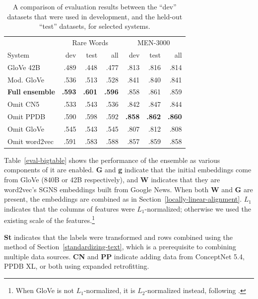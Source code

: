 \documentclass[11pt,letterpaper]{article}
\begin{document}
\begin{table}[t]
\footnotesize
\centering
\begin{tabular}{l|rrr|rrr}
\toprule
                   & \multicolumn{3}{|c|}{Rare Words} & \multicolumn{3}{|c}{MEN-3000} \\
System             &       dev &     test &      all &      dev &     test &      all \\
\midrule
GloVe 42B          &      .489 &     .448 &     .477 &     .813 &     .816 &     .814 \\
Mod. GloVe         &      .536 &     .513 &     .528 &     .841 &     .840 &     .841 \\
\bf Full ensemble  & \bf  .593 & \bf .601 & \bf .596 &     .858 &     .861 &     .859 \\
Omit CN5           &      .533 &     .543 &     .536 &     .842 &     .847 &     .844 \\
Omit PPDB          &      .590 &     .598 &     .592 & \bf .858 & \bf .862 & \bf .860 \\
Omit GloVe         &      .545 &     .543 &     .545 &     .807 &     .812 &     .808 \\
Omit word2vec      &      .591 &     .583 &     .588 &     .857 &     .859 &     .858 \\
\bottomrule
\end{tabular}

\caption{
    A comparison of evaluation results between the ``dev'' datasets that were
    used in development, and the held-out ``test'' datasets, for selected systems.
}
\label{eval-dev-test}
\end{table}


Table~\ref{eval-bigtable} shows the performance of the ensemble as various
components of it are enabled. {\bf G} and {\bf g} indicate that the initial
embeddings come from GloVe (840B or 42B respectively), and {\bf W} indicates
that they are word2vec's SGNS embeddings built from Google News. When both
{\bf W} and {\bf G} are present, the embeddings are combined as in
Section~\ref{locally-linear-alignment}. $L_1$ indicates that the columns of
features were $L_1$-normalized; otherwise we used the existing scale of the
features.\footnote{
    When GloVe is not $L_1$-normalized, it is $L_2$-normalized instead,
    following .
}

{\bf St} indicates that the labels were transformed and rows combined using the
method of Section~\ref{standardizing-text}, which is a prerequisite to combining
multiple data sources. {\bf CN} and {\bf PP} indicate adding data from
ConceptNet 5.4, PPDB XL, or both using expanded retrofitting.
\end{document}
